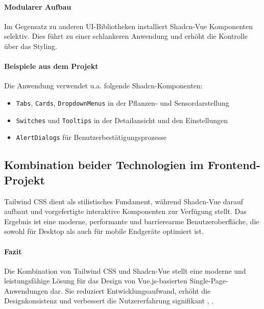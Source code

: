 \paragraph{Modularer Aufbau}
Im Gegensatz zu anderen UI-Bibliotheken installiert Shadcn-Vue Komponenten selektiv. Dies f\"uhrt zu einer schlankeren Anwendung und erh\"oht die Kontrolle \"uber das Styling.

\paragraph{Beispiele aus dem Projekt}
Die Anwendung verwendet u.a. folgende Shadcn-Komponenten:
\begin{itemize}
	\item \texttt{Tabs}, \texttt{Cards}, \texttt{DropdownMenus} in der Pflanzen- und Sensordarstellung
	\item \texttt{Switches} und \texttt{Tooltips} in der Detailansicht und den Einstellungen
	\item \texttt{AlertDialogs} f\"ur Benutzerbest\"atigungsprozesse
\end{itemize}

\subsection{Kombination beider Technologien im Frontend-Projekt}
Tailwind CSS dient als stilistisches Fundament, w\"ahrend Shadcn-Vue darauf aufbaut und vorgefertigte interaktive Komponenten zur Verf\"ugung stellt. Das Ergebnis ist eine moderne, performante und barrierearme Benutzeroberfl\"ache, die sowohl f\"ur Desktop als auch f\"ur mobile Endger\"ate optimiert ist.

\paragraph{Fazit}
Die Kombination von Tailwind CSS und Shadcn-Vue stellt eine moderne und leistungsf\"ahige L\"osung f\"ur das Design von Vue.js-basierten Single-Page-Anwendungen dar. Sie reduziert Entwicklungsaufwand, erh\"oht die Designkonsistenz und verbessert die Nutzererfahrung signifikant \cite{Guimaraes2021}, \cite{TailwindCSS}.
